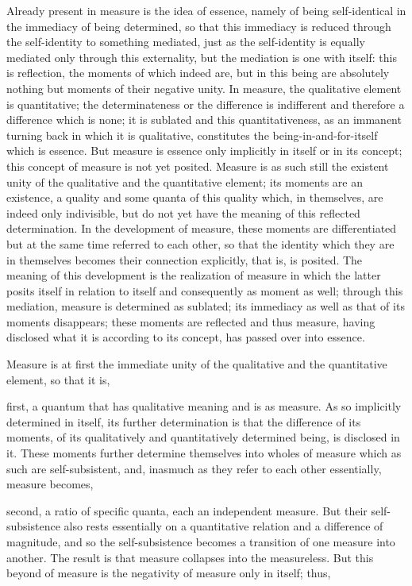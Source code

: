Already present in measure is the idea of essence,
namely of being self-identical in
the immediacy of being determined,
so that this immediacy is reduced
through the self-identity to something mediated,
just as the self-identity is equally mediated
only through this externality,
but the mediation is one with itself:
this is reflection, the moments of which indeed are,
but in this being are absolutely nothing but
moments of their negative unity.
In measure, the qualitative element is quantitative;
the determinateness or the difference is indifferent
and therefore a difference which is none;
it is sublated and this quantitativeness,
as an immanent turning back in which it is qualitative,
constitutes the being-in-and-for-itself which is essence.
But measure is essence only implicitly in itself or in its concept;
this concept of measure is not yet posited.
Measure is as such still the existent unity of the
qualitative and the quantitative element;
its moments are an existence, a quality and some quanta of this quality
which, in themselves, are indeed only indivisible,
but do not yet have the meaning of this reflected determination.
In the development of measure, these moments are differentiated
but at the same time referred to each other,
so that the identity which they are in themselves becomes
their connection explicitly, that is, is posited.
The meaning of this development is the realization of measure
in which the latter posits itself in relation to itself
and consequently as moment as well;
through this mediation, measure is determined as sublated;
its immediacy as well as that of its moments disappears;
these moments are reflected and thus measure,
having disclosed what it is according to its concept,
has passed over into essence.

Measure is at first the immediate unity of
the qualitative and the quantitative element, so that it is,

first, a quantum that has qualitative meaning and is as measure.
As so implicitly determined in itself, its further determination is that
the difference of its moments,
of its qualitatively and quantitatively determined being,
is disclosed in it.
These moments further determine themselves into
wholes of measure which as such are self-subsistent,
and, inasmuch as they refer to each other essentially,
measure becomes,

second, a ratio of specific quanta, each an independent measure.
But their self-subsistence also rests essentially
on a quantitative relation and a difference of magnitude,
and so the self-subsistence becomes a transition
of one measure into another.
The result is that measure collapses into the measureless.
But this beyond of measure is the negativity of measure
only in itself; thus,

